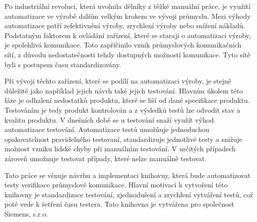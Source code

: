 \begin{introduction}
Po industriální revoluci, která uvolnila dělníky z těžké manuální práce, je využití automatizace ve výrobě dalším velkým krokem ve vývoji průmyslu. 
Mezi výhody automatizace patří zefektivnění výroby, zrychlení výroby nebo snížení nákladů. Podstatným faktorem k ovládání zařízení, které se starají o automatizaci výroby, je spolehlivá komunikace. Toto zapříčinilo vznik průmyslových komunikačních sítí, z důvodu nedostatečnosti tehdy dostupných možností komunikace. Tyto sítě byli s postupem času standardizovány.

Při vývoji těchto zařízení, které se podílí na automatizaci výroby, je stejně důležité jako například jejich návrh také jejich testování. Hlavním úkolem této fáze je odhalení nedostatků produktu, které se liší od dané specifikace produktu. Testováním je tedy produkt kontrolován a z výsledků testů lze odvodit stav a kvalitu produktu. V dnešních době se u testování snaží využít výhod automatizace testování. Automatizace testů umožňuje jednoduchou opakovatelnost pravidelného testovaní, standardizuje jednotlivé testy a snižuje možnost vzniku lidské chyby při manuálním testování. V určitých případech zároveň umožnuje testovat případy, které nelze manuálně testovat.

Tato práce se věnuje návrhu a implementaci knihovny, která bude automatizovat testy verifikace průmyslové komunikace. Hlavní motivací k vytvoření této knihovny je standardizace testování, zjednodušení a zrychlení vytváření testů, což poté vede k šetření času testera. Tato knihovna je vytvářena pro společnost Siemens, s.r.o.

\end{introduction}
